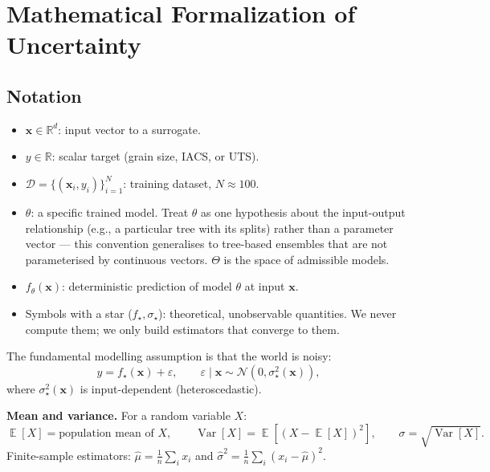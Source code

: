 \documentclass[11pt,a4paper]{article}
\DeclareMathOperator{\Var}{Var}
\DeclareMathOperator{\E}{\mathbb{E}}
\begin{document}
\newpage
\section{Mathematical Formalization of Uncertainty}
\label{sec:math}

\subsection{Notation}
\label{sec:notation}

\begin{itemize}
    \item $\bm x \in \mathbb{R}^d$: input vector to a surrogate.
    \item $y \in \mathbb{R}$: scalar target (grain size, IACS, or UTS).
    \item $\mathcal{D} = \{(\bm x_i, y_i)\}_{i=1}^N$: training dataset, $N \approx 100$.
    \item $\theta$: a specific trained model. Treat $\theta$ as one hypothesis about the input-output relationship (e.g., a particular tree with its splits) rather than a parameter vector --- this convention generalises to tree-based ensembles that are not parameterised by continuous vectors. $\Theta$ is the space of admissible models.
    \item $f_\theta(\bm x)$: deterministic prediction of model $\theta$ at input $\bm x$.
    \item Symbols with a star ($f_\star, \sigma_\star$): theoretical, unobservable quantities. We never compute them; we only build estimators that converge to them.
\end{itemize}

The fundamental modelling assumption is that the world is noisy:
\begin{equation}
y = f_\star(\bm x) + \varepsilon, \qquad \varepsilon \mid \bm x \sim \mathcal{N}(0, \sigma_\star^2(\bm x)),
\label{eq:data-model}
\end{equation}
where $\sigma_\star^2(\bm x)$ is input-dependent (heteroscedastic).

\begin{recapbox}
\textbf{Mean and variance.} For a random variable $X$:
\[
\E[X] = \text{population mean of } X, \qquad
\Var[X] = \E\!\left[(X - \E[X])^2\right], \qquad \sigma = \sqrt{\Var[X]}.
\]
Finite-sample estimators: $\hat\mu = \frac{1}{n}\sum_i x_i$ and $\hat\sigma^2 = \frac{1}{n}\sum_i (x_i - \hat\mu)^2$.
\end{recapbox}
\end{document}
